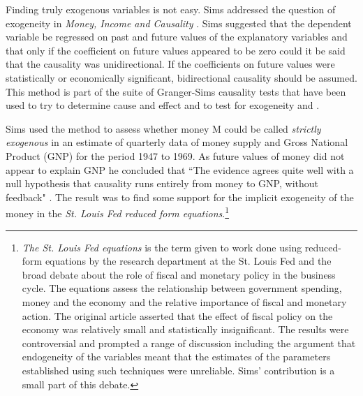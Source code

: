 \documentclass[12pt, a4paper, oneside]{article}\usepackage[]{graphicx}\usepackage[]{color}
\begin{document}
Finding truly exogenous variables is not easy.  Sims addressed the question of exogeneity in \emph{Money, Income and Causality} \citep{Sims1972Money}.   Sims suggested that the dependent variable be regressed on past and future values of the explanatory variables and that only if the coefficient on future values appeared to be zero could it be said that the causality was unidirectional.  If the coefficients on future values were statistically or economically significant, bidirectional causality should be assumed. This method is part of the suite of Granger-Sims causality tests that have been used to try to determine cause and effect and to test for exogeneity \citep{GrangerCause} and \citep{Sims1972Money}.    %

Sims used the method to assess whether money M could be called \emph{strictly exogenous} in an estimate of quarterly data of money supply and Gross National Product (GNP) for the period 1947 to 1969.    As future values of money did not appear to explain GNP he concluded that   ``The evidence agrees quite well with a null hypothesis that causality runs entirely from money to GNP, without feedback" \citet[p. 541]{Sims1972Money}.    The result was to find some support for the implicit exogeneity of the money in the \emph{St. Louis Fed reduced form equations}.\footnote{\emph{The St. Louis Fed equations} is the term given to work done using reduced-form equations by the research department at the St. Louis Fed and the broad debate about the role of fiscal and monetary policy in the business cycle.  The equations assess the relationship between government spending, money and the economy and the relative importance of fiscal and monetary action.  The original article \citep{StLouisFed} asserted that the effect of fiscal policy on the economy was relatively small and statistically insignificant.  The results were controversial and prompted a range of discussion including the argument that endogeneity of the variables meant that the estimates of the parameters established using such techniques were unreliable. Sims' contribution is a small part of this debate.} 
\end{document}
